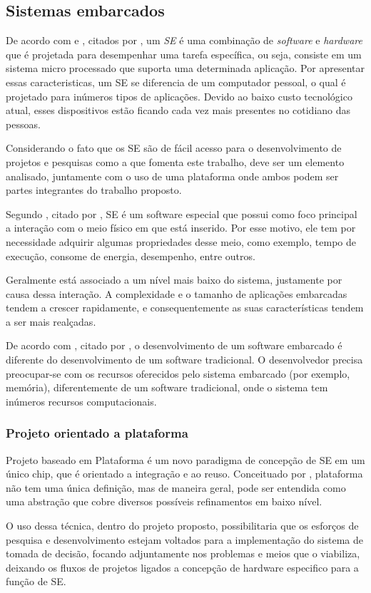 \subsection{Sistemas embarcados}
\par
De acordo com \cite{BAR99} e \cite{CAR03}, citados por \cite{BEQ09}, um \emph{\acl{SE}} é uma combinação de \textit{software} e \textit{hardware} que é projetada para desempenhar uma tarefa específica, ou seja, consiste em um sistema micro processado que suporta uma determinada aplicação. 
Por apresentar essas caracteristicas, um \ac{SE} se diferencia de um computador pessoal, o qual é projetado para inúmeros tipos de aplicações. Devido ao baixo custo tecnológico atual, esses dispositivos estão ficando cada vez mais presentes no cotidiano das pessoas.
\par
Considerando o fato que os \ac{SE} são de fácil acesso para o desenvolvimento de projetos e pesquisas como a que fomenta este trabalho, deve ser um elemento analisado, juntamente com o uso de uma plataforma onde ambos podem ser partes integrantes do trabalho proposto.
\par
Segundo \cite{LEE01}, citado por \cite{BEQ09}, \ac{SE} é um software especial que possui como foco principal a interação com o meio físico em que está inserido. Por esse motivo, ele tem por necessidade adquirir algumas propriedades desse meio, como exemplo, tempo de execução, consome de energia, desempenho, entre outros.
\par
Geralmente está associado a um nível mais baixo do sistema, justamente por causa dessa interação. A complexidade e o tamanho de aplicações embarcadas tendem a crescer rapidamente, e consequentemente as suas características tendem a ser mais realçadas.
\par
De acordo com \cite{TAU05}, citado por \cite{BEQ09}, o desenvolvimento de um software embarcado é diferente do desenvolvimento de um software tradicional. O desenvolvedor precisa preocupar-se com os recursos oferecidos pelo sistema embarcado (por exemplo, memória), diferentemente de um software tradicional, onde o sistema tem inúmeros recursos computacionais.

\subsubsection{Projeto orientado a plataforma}
\par
Projeto baseado em Plataforma é um novo paradigma de concepção de \ac{SE} em um único chip, que é orientado a integração e ao reuso. Conceituado por \cite{VIN01}, plataforma não tem uma única definição, mas de maneira geral, pode ser entendida como uma abstração que cobre diversos possíveis refinamentos em baixo nível.
\par
O uso dessa técnica, dentro do projeto proposto, possibilitaria que os esforços de pesquisa e desenvolvimento estejam voltados para a implementação do sistema de tomada de decisão, focando adjuntamente nos problemas e meios que o viabiliza, deixando os fluxos de projetos ligados a concepção de hardware especifico para a função de \acl{SE}.


